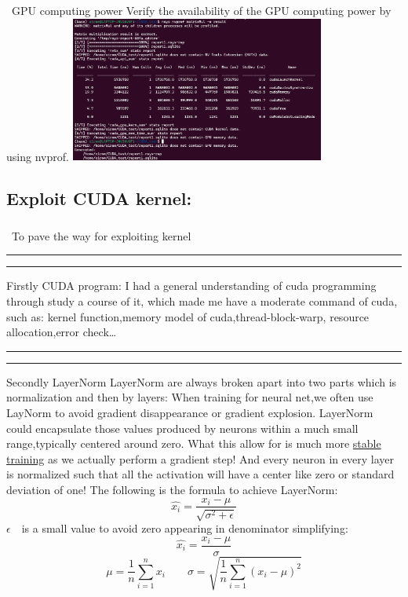 \subsubsection{}~GPU computing power\newline
Verify the availability of the GPU computing power by using nvprof.\newline
\includegraphics[width=3.3in]{photograph/nvprof.png}\newline

\subsection{Exploit CUDA kernel:}
\subsubsection{}~To pave the way for exploiting kernel\newline
\rule{\textwidth}{0pt}
\rule{\textwidth}{0pt}
Firstly\newline
CUDA program:\newline
I had a general understanding of cuda programming through study a course of it, which made me
have a moderate command of cuda, such as: kernel function,memory model of cuda,thread-block-warp,
resource allocation,error check\dots\newline
\rule{\textwidth}{0pt}
\rule{\textwidth}{0pt}
Secondly\newline
LayerNorm\newline
LayerNorm are always broken apart into two parts which is normalization and then by layers:\newline
When training for neural net,we often use LayNorm to avoid gradient disappearance or gradient explosion.
LayerNorm could encapsulate those values produced by neurons within a much small range,typically centered
around zero. What this allow for is much more \underline{stable training} as we actually perform a gradient step!\newline
And every neuron in every layer is normalized such that all the activation will have a center like zero or
standard deviation of one!\newline 
The following is the formula to achieve LayerNorm:\newline
\[
\hat{x_{i}} = \frac{x_{i} - \mu}{\sqrt{\sigma^2 + \epsilon}}
\]
$\epsilon$~~is a small value to avoid zero appearing in denominator\newline
simplifying:
\[
\hat{x_{i}} = \frac{x_{i} - \mu}{\sigma}
\]
\[
\mu = \frac{1}{n}\sum_{i=1}^nx_{i} \qquad
\sigma = \sqrt{\frac{1}{n}\sum_{i=1}^{n}(x_{i} - \mu)^2}
\]
\vspace{0.5cm}
